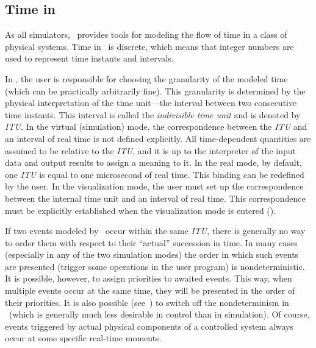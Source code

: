 \subsection {Time in \smurph}
\label {rm_mp_ti}

As all simulators, \smurph\ provides tools for
modeling the flow of time in a class of physical systems.
Time in \smurph\ is discrete, which means that integer numbers are used
to represent time instants and intervals.

In \smurph, the user is responsible for choosing the granularity of the
modeled time (which can be practically arbitrarily fine).
This granularity is determined by the physical interpretation
of the time unit---the interval between two consecutive time instants.
This interval is called the {\em indivisible time unit\/} and is denoted
by {\em ITU}.
In the virtual (simulation) mode,
the correspondence between the {\em ITU\/} and an interval of real time
is not defined explicitly.
All time-dependent quantities are assumed to be relative to the {\em ITU},
and it is up to the interpreter of the input data and output results
to assign a meaning to it.
In the real mode, by default, one {\em ITU\/} is equal to one microsecond
of real time.
This binding can be redefined by the user.
In the visualization mode, the user must set up the correspondence between
the internal time unit and an interval of real time.
This correspondence must be explicitly established when the visualization
mode is entered ().

If two events modeled by \smurph\ occur within the same {\em ITU}, there
is generally
no way to order them with respect to their ``actual'' succession in time.
In many cases (especially in any of the two simulation modes)
the order in which such events are presented (trigger some
operations in the user program) is nondeterministic.
It is possible, however, to assign priorities to awaited events.
This way, when multiple events occur at the same time, they will be
presented in the order of their priorities.
It is also possible (see~) to switch off the nondeterminism
in \smurph\ (which is generally much less desirable in control than in
simulation).
Of course, events triggered by actual physical components of a controlled
system always occur at some specific real-time moments.

